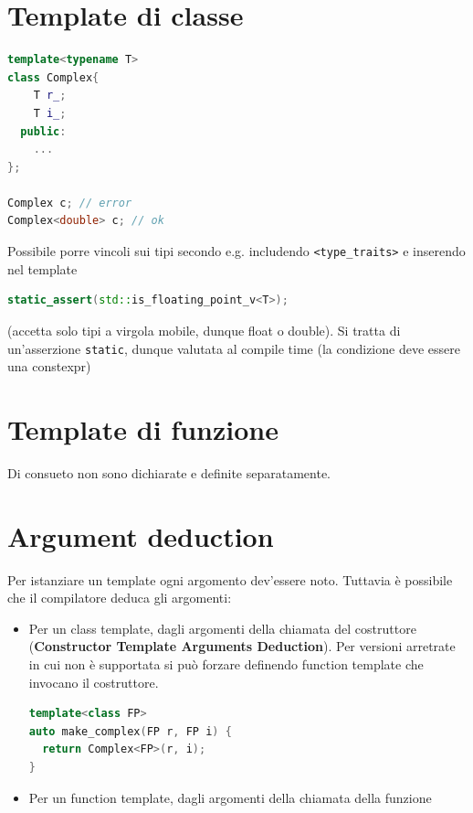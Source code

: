 \documentclass[10pt, oneside]{book}
\begin{document}
\section{Template di classe}
\begin{lstlisting}[language=C++]
template<typename T>
class Complex{
    T r_;
    T i_;
  public:
    ...
};

Complex c; // error
Complex<double> c; // ok
\end{lstlisting}
Possibile porre vincoli sui tipi secondo e.g. includendo \texttt{<type\_traits>} e inserendo nel template
\begin{lstlisting}[language=C++]
static_assert(std::is_floating_point_v<T>);
\end{lstlisting}
(accetta solo tipi a virgola mobile, dunque float o double). Si tratta di un'asserzione \texttt{static}, dunque valutata al compile time (la condizione deve essere una constexpr)

\section{Template di funzione}
Di consueto non sono dichiarate e definite separatamente.

\section{Argument deduction}
Per istanziare un template ogni argomento dev'essere noto. Tuttavia è possibile che il compilatore deduca gli argomenti:
\begin{itemize}
\item Per un class template, dagli argomenti della chiamata del costruttore (\textbf{Constructor Template Arguments Deduction}). Per versioni arretrate in cui non è supportata si può forzare definendo function template che invocano il costruttore.
\begin{lstlisting}[language=C++]
template<class FP>
auto make_complex(FP r, FP i) {
  return Complex<FP>(r, i);
}
\end{lstlisting}
\item Per un function template, dagli argomenti della chiamata della funzione
\end{itemize}
\end{document}
